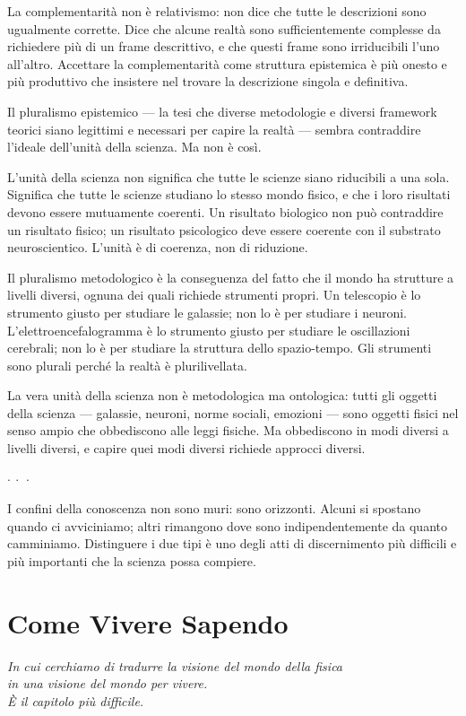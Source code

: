 \documentclass[12pt,a4paper,openany]{book}
\newcommand{\sezione}[1]{\vspace{1.2em}{\large\bfseries #1}\vspace{0.5em}\par}
\newcommand{\puntini}{\begin{center}$\cdot\ \cdot\ \cdot$\end{center}\vspace{0.3em}}
\begin{document}
La complementarità non è relativismo: non dice che tutte le descrizioni sono ugualmente corrette. Dice che alcune realtà sono sufficientemente complesse da richiedere più di un frame descrittivo, e che questi frame sono irriducibili l'uno all'altro. Accettare la complementarità come struttura epistemica è più onesto e più produttivo che insistere nel trovare la descrizione singola e definitiva.

\sezione{Il pluralismo epistemico e l'unità della scienza}

Il pluralismo epistemico --- la tesi che diverse metodologie e diversi framework teorici siano legittimi e necessari per capire la realtà --- sembra contraddire l'ideale dell'unità della scienza. Ma non è così.

L'unità della scienza non significa che tutte le scienze siano riducibili a una sola. Significa che tutte le scienze studiano lo stesso mondo fisico, e che i loro risultati devono essere mutuamente coerenti. Un risultato biologico non può contraddire un risultato fisico; un risultato psicologico deve essere coerente con il substrato neuroscientico. L'unità è di coerenza, non di riduzione.

Il pluralismo metodologico è la conseguenza del fatto che il mondo ha strutture a livelli diversi, ognuna dei quali richiede strumenti propri. Un telescopio è lo strumento giusto per studiare le galassie; non lo è per studiare i neuroni. L'elettroencefalogramma è lo strumento giusto per studiare le oscillazioni cerebrali; non lo è per studiare la struttura dello spazio-tempo. Gli strumenti sono plurali perché la realtà è plurilivellata.

La vera unità della scienza non è metodologica ma ontologica: tutti gli oggetti della scienza --- galassie, neuroni, norme sociali, emozioni --- sono oggetti fisici nel senso ampio che obbediscono alle leggi fisiche. Ma obbediscono in modi diversi a livelli diversi, e capire quei modi diversi richiede approcci diversi.

\puntini

I confini della conoscenza non sono muri: sono orizzonti. Alcuni si spostano quando ci avviciniamo; altri rimangono dove sono indipendentemente da quanto camminiamo. Distinguere i due tipi è uno degli atti di discernimento più difficili e più importanti che la scienza possa compiere.

\part{Come Vivere Sapendo}
\begin{center}
\itshape
In cui cerchiamo di tradurre la visione del mondo della fisica\\
in una visione del mondo per vivere.\\[0.5em]
\textit{È il capitolo più difficile.}
\end{center}
\clearpage
\end{document}
